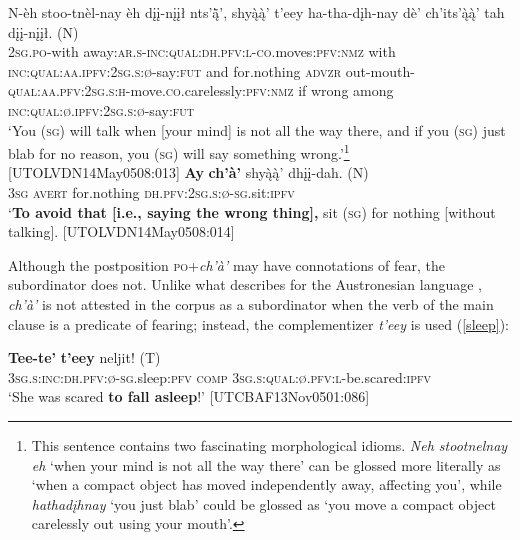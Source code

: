 \documentclass[output=paper,colorlinks,citecolor=brown]{langscibook}
\begin{document}
\begin{exe}
\ex 
\label{avert-pp}
\begin{xlista}
\ex \label{avert-ppa}
\gll N-èh stoo-tnèl-nay èh dįį-nįįł nts'ą̈̀', shyą̀ą̀' t'eey ha-tha-dįh-nay dè' ch'its'ą̀ą̀' tah {dįį-nįįł. \textnormal{(N)}} \\
\textsc{2sg.po}-with away:\textsc{ar.s-inc:qual:dh.pfv:l-co}.moves:\textsc{pfv:nmz} with \textsc{inc:qual:aa.ipfv:2sg.s:ø}-say:\textsc{fut} and for.nothing \textsc{advzr} out-mouth-\textsc{qual:aa.pfv:2sg.s:h}-move.\textsc{co}.carelessly\textsc{:pfv:nmz} if wrong among \textsc{inc:qual:ø.ipfv:2sg.s:ø}-say:\textsc{fut} \\
\glt `You (\textsc{sg}) will talk when [your mind] is not all the way there, and if you (\textsc{sg}) just blab for no reason, you (\textsc{sg}) will say something wrong.'\footnote{This sentence contains two fascinating morphological idioms. \textit{Neh stootnelnay eh} `when your mind is not all the way there' can be glossed more literally as `when a compact object has moved independently away, affecting you', while \textit{hathadįhnay} `you just blab' could be glossed as `you move a compact object carelessly out using your mouth'.} \\ \hfill [UTOLVDN14May0508:013]
\ex\label{avert-ppb}
\gll \textbf{Ay} \textbf{ch'à'} shyą̀ą̀' {dhįį-dah. \textnormal{(N)}} \\
\textsc{3sg} \textsc{avert} for.nothing \textsc{dh.pfv:2sg.s:ø-sg}.sit:\textsc{ipfv} \\
\glt `\textbf{To avoid that [i.e., saying the wrong thing],} sit (\textsc{sg}) for nothing [without talking]. \hfill [UTOLVDN14May0508:014]
\end{xlista}
\end{exe}


Although the postposition \textsc{po}+\textit{ch'à'} may have connotations of fear, the subordinator does not. Unlike what \citet[296–297]{LichtenberkF1995} describes for the Austronesian language , \textit{ch'à'} is not attested in the corpus as a subordinator when the verb of the main clause is a predicate of fearing; instead, the complementizer \textit{t'eey} is used (\ref{sleep}):

\ea
\label{sleep}
\gll \textbf{Tee-te'} \textbf{t'eey} {neljit! \textnormal{(T)}} \\
\textsc{3sg.s:inc:dh.pfv:ø-sg}.sleep:\textsc{pfv} \textsc{comp} \textsc{3sg.s:qual:ø.pfv:l}-be.scared:\textsc{ipfv} \\
\glt `She was scared \textbf{to fall asleep}!' \hfill [UTCBAF13Nov0501:086]
\z
\end{document}
